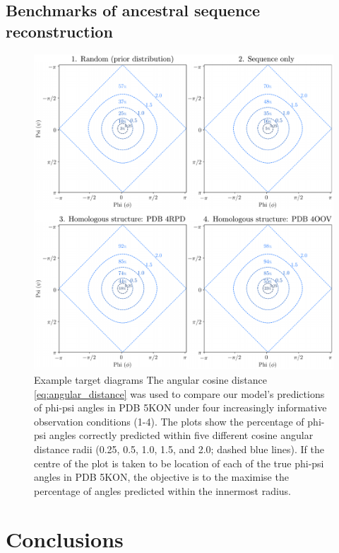 \documentclass[nogrid]{MBE}%
\newcommand{\revcom}[1]{{\color{orange} #1}}
\begin{document}
\subsection{Benchmarks of ancestral sequence reconstruction}
\begin{figure}
	\centering
	\includegraphics[width=2.0\columnwidth]{figures/benchmarks-target-plot.pdf}
	\caption{\revcom{Example target diagrams} The angular cosine distance \eqref{eq:angular_distance} was used to compare our model's predictions of phi-psi angles in PDB 5KON under four increasingly informative observation conditions (1-4). The plots show the percentage of phi-psi angles correctly predicted within five different cosine angular distance radii (0.25, 0.5, 1.0, 1.5, and 2.0; dashed blue lines). If the centre of the plot is taken to be location of each of the true phi-psi angles in PDB 5KON, the objective is to the maximise the percentage of angles predicted within the innermost radius.}%
	\label{fig:benchmarkstarget}%
\end{figure}
	
\section{Conclusions}
\end{document}
